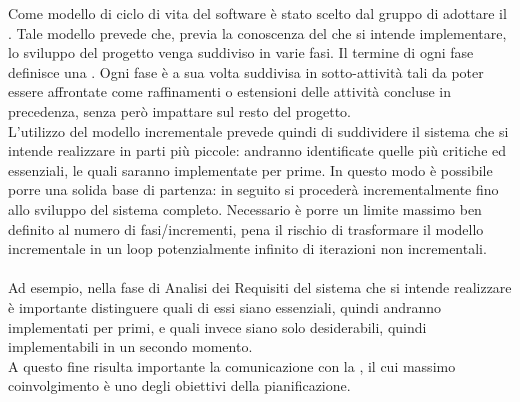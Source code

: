 Come modello di ciclo di vita del software è stato scelto dal gruppo di adottare il . Tale modello prevede che, previa la conoscenza del  che si intende implementare, lo sviluppo del progetto venga suddiviso in varie fasi. Il termine di ogni fase definisce una . Ogni fase è a sua volta suddivisa in sotto-attività tali da poter essere affrontate come raffinamenti o estensioni delle attività concluse in precedenza, senza però impattare sul resto del progetto.
\\L'utilizzo del modello incrementale prevede quindi di suddividere il sistema che si intende realizzare in parti più piccole: andranno identificate quelle più critiche ed essenziali, le quali saranno implementate per prime. In questo modo è possibile porre una solida base di partenza: in seguito si procederà incrementalmente fino allo sviluppo del sistema completo. Necessario è porre un limite massimo ben definito al numero di fasi/incrementi, pena il rischio di trasformare il modello incrementale in un loop potenzialmente infinito di iterazioni non incrementali.
\\\\Ad esempio, nella fase di Analisi dei Requisiti del sistema che si intende realizzare è importante distinguere quali di essi siano essenziali, quindi andranno implementati per primi, e quali invece siano solo desiderabili, quindi implementabili in un secondo momento.
\\A questo fine risulta importante la comunicazione con la  , il cui massimo coinvolgimento è uno degli obiettivi della pianificazione.

